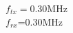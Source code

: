 \documentclass[preview]{standalone}
\begin{document}
\begin{center}
$f_{tx}=$0.30MHz\\$f_{rx}$=0.30MHz
\end{center}
\end{document}
